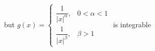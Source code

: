 \documentclass[preview]{standalone}
\begin{document}
\begin{center}
but $g(x)=\begin{cases} \dfrac{1}{|x|^\alpha} , & 0< \alpha <1 \\  \dfrac{1}{|x|^\beta} , & \beta > 1 \end{cases}$ is integrable
\end{center}
\end{document}
